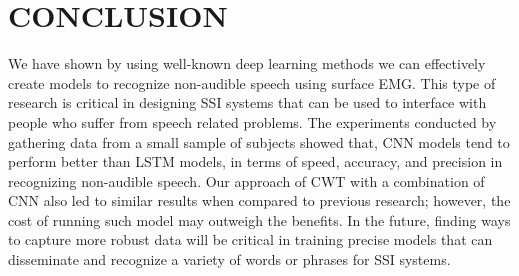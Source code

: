 \documentclass{article}
\begin{document}
\section{CONCLUSION}
\label{sec:CONCLUSION}

We have shown by using well-known deep learning methods we can effectively create models to recognize non-audible speech using surface EMG. This type of research is critical in designing SSI systems that can be used to interface with people who suffer from speech related problems. The experiments conducted by gathering data from a small sample of subjects showed that, CNN models tend to perform better than LSTM models, in terms of speed, accuracy, and precision in recognizing non-audible speech. Our approach of CWT with a combination of CNN also led to similar results when compared to previous research; however, the cost of running such model may outweigh the benefits. In the future, finding ways to capture more robust data will be critical in training precise models that can disseminate and recognize a variety of words or phrases for SSI systems.



\end{document}
